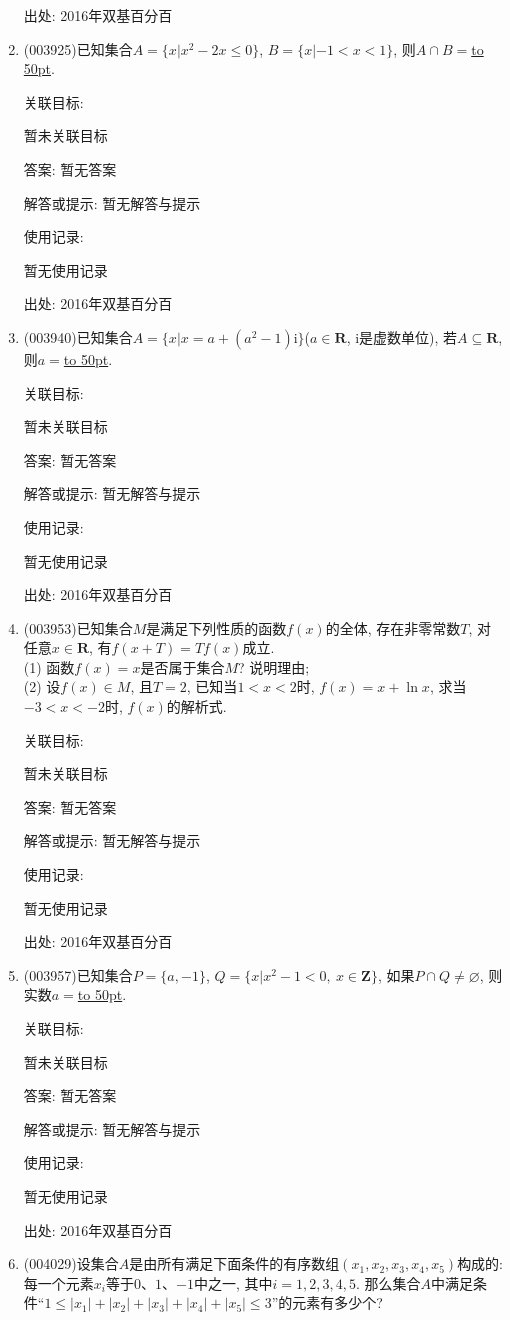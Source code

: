 \documentclass[10pt,a4paper]{article}
\newcommand{\blank}[1]{\underline{\hbox to #1pt{}}}
\begin{document}
\begin{enumerate}[1.]
出处: 2016年双基百分百
\item { (003925)}已知集合$A=\{x|x^2-2x\le 0 \}$, $B=\{x|-1<x<1\}$, 则$A\cap B=$\blank{50}.


关联目标:

暂未关联目标

答案: 暂无答案

解答或提示: 暂无解答与提示

使用记录:

暂无使用记录


出处: 2016年双基百分百
\item { (003940)}已知集合$A=\{x|x=a+(a^2-1)\mathrm{i}\}$($a\in \mathbf{R}$, $\mathrm{i}$是虚数单位), 若$A\subseteq \mathbf{R}$, 则$a=$\blank{50}.


关联目标:

暂未关联目标

答案: 暂无答案

解答或提示: 暂无解答与提示

使用记录:

暂无使用记录


出处: 2016年双基百分百
\item { (003953)}已知集合$M$是满足下列性质的函数$f(x)$的全体, 存在非零常数$T$, 对任意$x\in \mathbf{R}$, 有$f(x+T)=Tf(x)$成立.\\
(1) 函数$f(x)=x$是否属于集合$M$? 说明理由;\\
(2) 设$f(x)\in M$, 且$T=2$, 已知当$1<x<2$时, $f(x)=x+\ln x$, 求当$-3<x<-2$时, $f(x)$的解析式.


关联目标:

暂未关联目标

答案: 暂无答案

解答或提示: 暂无解答与提示

使用记录:

暂无使用记录


出处: 2016年双基百分百
\item { (003957)}已知集合$P=\{a,-1\}$, $Q=\{x|x^2-1<0, \ x\in \mathbf{Z}\}$, 如果$P\cap Q\ne\varnothing$, 则实数$a=$\blank{50}.


关联目标:

暂未关联目标

答案: 暂无答案

解答或提示: 暂无解答与提示

使用记录:

暂无使用记录


出处: 2016年双基百分百
\item { (004029)}设集合$A$是由所有满足下面条件的有序数组$(x_1,x_2,x_3,x_4,x_5)$构成的: 每一个元素$x_i$等于$0$、$1$、$-1$中之一, 其中$i=1,2,3,4,5$. 那么集合$A$中满足条件``$1\le |x_1|+|x_2|+|x_3|+|x_4|+|x_5|\le 3$''的元素有多少个?



\end{enumerate}
\end{document}
